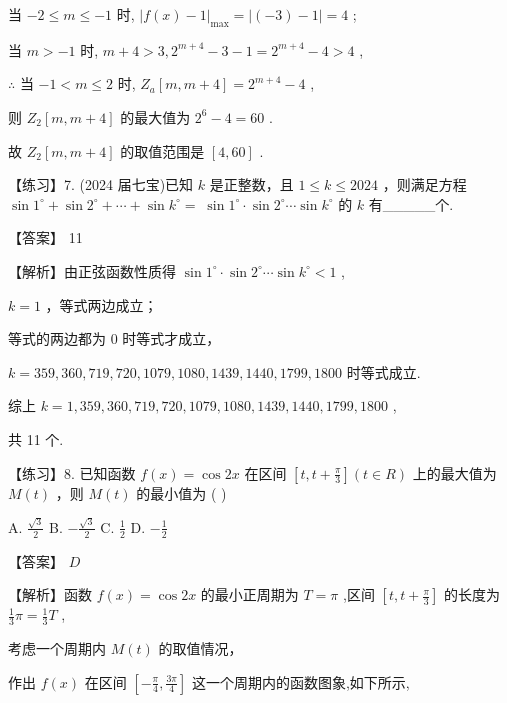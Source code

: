 \documentclass[10pt]{article}
\newcommand*\circled[1]{\tikz[baseline=(char.base)]{\node[shape=circle,draw,inner sep=1.5pt] (char) {\small #1};}}
\begin{document}
当 \(- 2 \leq  m \leq   - 1\) 时, \({\left| f\left( x\right)  - 1\right| }_{\max } = \left| {\left( {-3}\right)  - 1}\right|  = 4\) ;

当 \(m >  - 1\) 时, \(m + 4 > 3,{2}^{m + 4} - 3 - 1 = {2}^{m + 4} - 4 > 4\) ,

\(\therefore\) 当 \(- 1 < m \leq  2\) 时, \({Z}_{a}\left\lbrack  {m,m + 4}\right\rbrack   = {2}^{m + 4} - 4\) ,

则 \({Z}_{2}\left\lbrack  {m,m + 4}\right\rbrack\) 的最大值为 \({2}^{6} - 4 = {60}\) .

故 \({Z}_{2}\left\lbrack  {m,m + 4}\right\rbrack\) 的取值范围是 \(\left\lbrack  {4,{60}}\right\rbrack\) .

【练习】7. (2024 届七宝)已知 \(k\) 是正整数，且 \(1 \leq  k \leq  {2024}\) ，则满足方程 \(\sin {1}^{ \circ  } + \sin {2}^{ \circ  } + \cdots  + \sin {k}^{ \circ  } = \; \sin {1}^{ \circ  } \cdot  \sin {2}^{ \circ  }\cdots \sin {k}^{ \circ  }\) 的 \(k\) 有\_\_\_\_\_个.

【答案】 11

【解析】由正弦函数性质得 \(\sin {1}^{ \circ  } \cdot  \sin {2}^{ \circ  }\cdots \sin {k}^{ \circ  } < 1\) ,

 \circled{1}  \(k = 1\) ，等式两边成立；

 \circled{2} 等式的两边都为 0 时等式才成立，

\(k = {359},{360},{719},{720},{1079},{1080},{1439},{1440},{1799},{1800}\) 时等式成立.

综上 \(k = 1,{359},{360},{719},{720},{1079},{1080},{1439},{1440},{1799},{1800}\) ,

共 11 个.

【练习】8. 已知函数 \(f\left( x\right)  = \cos {2x}\) 在区间 \(\left\lbrack  {t,t + \frac{\pi }{3}}\right\rbrack  \left( {t \in  R}\right)\) 上的最大值为 \(M\left( t\right)\) ，则 \(M\left( t\right)\) 的最小值为 ( )

A. \(\frac{\sqrt{3}}{2}\) B. \(- \frac{\sqrt{3}}{2}\) C. \(\frac{1}{2}\) D. \(- \frac{1}{2}\)

【答案】 \(D\)

【解析】函数 \(f\left( x\right)  = \cos {2x}\) 的最小正周期为 \(T = \pi\) ,区间 \(\left\lbrack  {t,t + \frac{\pi }{3}}\right\rbrack\) 的长度为 \(\frac{1}{3}\pi  = \frac{1}{3}T\) ,

考虑一个周期内 \(M\left( t\right)\) 的取值情况，

作出 \(f\left( x\right)\) 在区间 \(\left\lbrack  {-\frac{\pi }{4},\frac{3\pi }{4}}\right\rbrack\) 这一个周期内的函数图象,如下所示,
\end{document}
